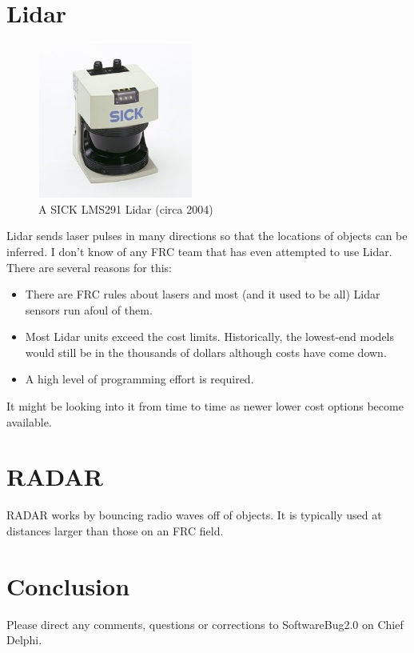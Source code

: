 \documentclass{article}
\begin{document}
\section{Lidar}
\begin{figure}[ht]
\centering
\includegraphics[width=2in]{SICK_LMS291.jpg}
\caption{A SICK LMS291 Lidar (circa 2004)}
\end{figure}

Lidar sends laser pulses in many directions so that the locations of objects can be inferred.  I don't know of any FRC team that has even attempted to use Lidar.  There are several reasons for this:
\begin{itemize}
\item There are FRC rules about lasers and most (and it used to be all) Lidar sensors run afoul of them.  
\item Most Lidar units exceed the cost limits.  Historically, the lowest-end models would still be in the thousands of dollars although costs have come down.  
\item A high level of programming effort is required.  
\end{itemize}

It might be looking into it from time to time as newer lower cost options become available.

\section{RADAR}
RADAR works by bouncing radio waves off of objects.  It is typically used at distances larger than those on an FRC field.  

\section{Conclusion}
Please direct any comments, questions or corrections to SoftwareBug2.0 on Chief Delphi.  
\end{document}
